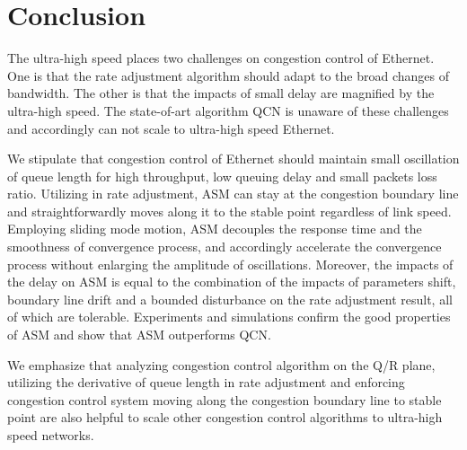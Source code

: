 \documentclass{sig-alternate-10pt}
\begin{document}
\iffalse
\begin{figure}
\centering
\texttt{[image: figure/tcp.eps]}
\caption{Trajectories of Congestion Control Algorithms}
\label{tcp}
\end{figure}

\subsection{Delay}

\subsection{Other Related Work}
ASM is designed using the method of sliding mode control. Previously, this method has been used in~\cite{SMVS, PengYan} to analyze the nonlinearity of TCP and design packets marking or dropping rules. But rate adjustment algorithm is designed in this paper. 
\fi

\section{Conclusion}
The ultra-high speed places two challenges on congestion control of Ethernet. One is that the rate adjustment algorithm should adapt to the broad changes of bandwidth. The other is that the impacts of small delay are magnified by the ultra-high speed. The state-of-art algorithm QCN is unaware of these challenges and accordingly can not scale to ultra-high speed Ethernet. 

We stipulate that congestion control of Ethernet should maintain small oscillation of queue length for high throughput, low queuing delay and small packets loss ratio. Utilizing  in rate adjustment, ASM can stay at the congestion boundary line and straightforwardly moves along it to the stable point regardless of link speed. Employing sliding mode motion, ASM decouples the response time and the smoothness of convergence process, and accordingly accelerate the convergence process without enlarging the amplitude of oscillations. Moreover, the impacts of the delay on ASM is equal to the combination of the impacts of parameters shift, boundary line drift and a bounded disturbance on the rate adjustment result, all of which are tolerable. Experiments and simulations confirm the good properties of ASM and show that ASM outperforms QCN. 

We emphasize that analyzing congestion control algorithm on the Q/R plane, utilizing the derivative of queue length in rate adjustment and enforcing congestion control system moving along the congestion boundary line to stable point are also helpful to scale other congestion control algorithms to ultra-high speed networks.
\end{document}
